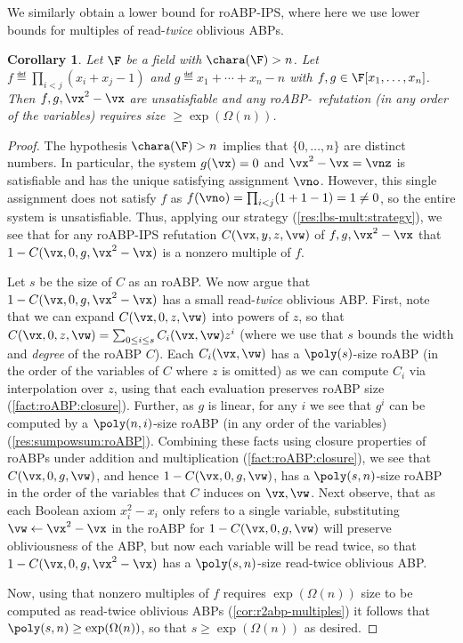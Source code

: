 \documentclass[11pt]{article}
\numberwithin{equation}{section}
\newtheorem{corollary}[theorem]{Corollary}
\theoremstyle{definition}
\theoremstyle{plain}
\begin{document}
We similarly obtain a lower bound for roABP-IPS, where here we use lower bounds for multiples of read-\emph{twice} oblivious ABPs.

\begin{corollary}\label{res:lbs-ips:mult:roABP}
        Let $\F$ be a field with $\chara(\F)>n$. Let $f\eqdef \prod_{i<j}(x_i+x_j-1)$ and $g\eqdef x_1+\cdots+x_n-n$ with $f,g\in\F[x_1,\ldots,x_n]$.  Then $f,g,\vx^2-\vx$ are unsatisfiable and any roABP-\IPS\ refutation (in any order of the variables) requires size $\ge\exp(\Omega(n))$.
\end{corollary}
\begin{proof}
        The hypothesis $\chara(\F)>n$ implies that $\{0,\ldots,n\}$ are distinct numbers.  In particular, the system $g(\vx)=0$ and $\vx^2-\vx=\vnz$ is satisfiable and has the unique satisfying assignment $\vno$.  However, this single assignment does not satisfy $f$ as $f(\vno)=\prod_{i<j}(1+1-1)=1\ne0$, so the entire system is unsatisfiable.  Thus, applying our strategy (\autoref{res:lbs-mult:strategy}), we see that for any roABP-IPS refutation $C(\vx,y,z,\vw)$ of $f,g,\vx^2-\vx$ that $1-C(\vx,0,g,\vx^2-\vx)$ is a nonzero multiple of $f$.

  Let $s$ be the size of $C$ as an roABP.  %
%
We  %
now argue that $1-C(\vx,0,g,\vx^2-\vx)$ has a small read-\emph{twice} oblivious ABP\@.  First, note that we can expand $C(\vx,0,z,\vw)$ into powers of $z$, so that $C(\vx,0,z,\vw)=\sum_{0\le i\le s} C_i(\vx,\vw)z^i$ (where we use that $s$ bounds the width and \emph{degree} of the roABP $C$).  Each $C_i(\vx,\vw)$ has a $\poly(s)$-size roABP (in the order of the variables of $C$ where $z$ is omitted) as we can compute $C_i$ via interpolation over $z$, using that each evaluation preserves roABP size (\autoref{fact:roABP:closure}).  Further, as $g$ is linear, for any $i$ we see that $g^i$ can be computed by a $\poly(n,i)$-size roABP (in any order of the variables) (\autoref{res:sumpowsum:roABP}).  Combining these facts using closure properties of roABPs under addition and multiplication (\autoref{fact:roABP:closure}), we see that $C(\vx,0,g,\vw)$, and hence $1-C(\vx,0,g,\vw)$, has a $\poly(s,n)$-size roABP in the order of the variables that $C$ induces on $\vx,\vw$.  Next observe, that as each Boolean axiom $x_i^2-x_i$ only refers to a single variable, substituting $\vw\leftarrow\vx^2-\vx$ in the roABP for $1-C(\vx,0,g,\vw)$ will preserve obliviousness of the ABP, but now each variable will be read twice, so that $1-C(\vx,0,g,\vx^2-\vx)$ has a $\poly(s,n)$-size read-twice oblivious ABP.

        Now, using that nonzero multiples of $f$ requires
%
$\exp(\Omega(n))$ size   %
to be computed as read-twice oblivious ABPs (\autoref{cor:r2abp-multiples}) it follows that $\poly(s,n)\ge\exp(\Omega(n))$, so that $s\ge\exp(\Omega(n))$ as desired.
\end{proof}
\end{document}
